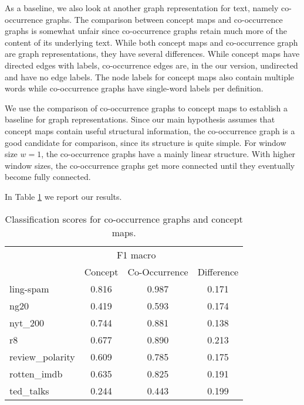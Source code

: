 As a baseline, we also look at another graph representation for text, namely co-occurrence graphs.
The comparison between concept maps and co-occurrence graphs is somewhat unfair since co-occurrence graphs retain much more of the content of its underlying text.
While both concept maps and co-occurrence graph are graph representations, they have several differences. While concept maps have directed edges with labels, co-occurrence edges are, in the our version, undirected and have no edge labels.
The node labels for concept maps also contain multiple words while co-occurrence graphs have single-word labels per definition.

We use the comparison of co-occurrence graphs to concept maps to establish a baseline for graph representations.
Since our main hypothesis assumes that concept maps contain useful structural information, the co-occurrence graph is a good candidate for comparison, since its structure is quite simple.
For window size $w=1$, the co-occurrence graphs have a mainly linear structure. With higher window sizes, the co-occurrence graphs get more connected until they eventually become fully connected.

In Table \ref{table:comparison_results_cooccurrence} we report our results.


\begin{table}[htb!]
    \centering
    \begin{tabular}{lcc|c}
    \toprule
        {} &  \multicolumn{2}{c}{F1 macro} \\
        & Concept &  Co-Occurrence & Difference \\
        \midrule
            ling-spam       & 0.816 & 0.987 & 0.171 \\
            ng20            & 0.419 & 0.593 & 0.174 \\
            nyt\_200         & 0.744 & 0.881 & 0.138 \\
            r8              & 0.677 & 0.890 & 0.213 \\
            review\_polarity & 0.609 & 0.785 & 0.175 \\
            rotten\_imdb     & 0.635 & 0.825 & 0.191 \\
            ted\_talks       & 0.244 & 0.443 & 0.199 \\
        \bottomrule
    \end{tabular}
    \caption[Results: Co-Occurrence vs. Concept Maps]{Classification scores for co-occurrence graphs and concept maps.}\label{table:comparison_results_cooccurrence}
\end{table}

